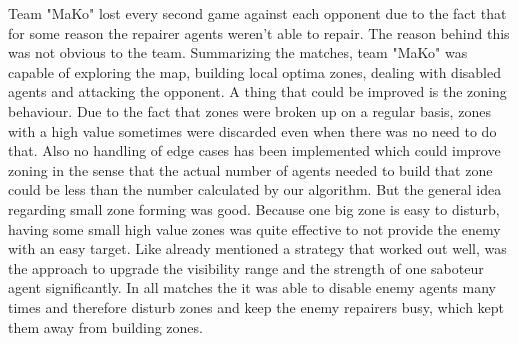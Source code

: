 Team "MaKo" lost every second game against each opponent due to the fact that for some reason the repairer agents weren't able to repair. The reason behind this was not obvious to the team. Summarizing the matches, team "MaKo" was capable of exploring the map, building local optima zones, dealing with disabled agents and attacking the opponent. A thing that could be improved is the zoning behaviour. Due to the fact that zones were broken up on a regular basis, zones with a high value sometimes were discarded even when there was no need to do that. Also no handling of edge cases has been implemented which could improve zoning in the sense that the actual number of agents needed to build that zone could be less than the number calculated by our algorithm. But the general idea regarding small zone forming was good. Because one big zone is easy to disturb, having some small high value zones was quite effective to not provide the enemy with an easy target. Like already mentioned a strategy that worked out well, was the approach to upgrade the visibility range and the strength of one saboteur agent significantly. In all matches the it was able to disable enemy agents many times and therefore disturb zones and keep the enemy repairers busy, which kept them away from building zones. 

